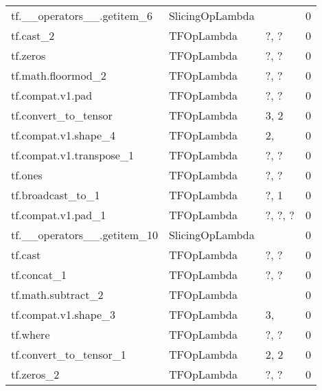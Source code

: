 \begin{longtable}{llll}
 tf.\_\_operators\_\_.getitem\_6 &    SlicingOpLambda &                                        &        0 \\
                  tf.cast\_2 &         TFOpLambda &                             ?, ? &        0 \\
                   tf.zeros &         TFOpLambda &                             ?, ? &        0 \\
         tf.math.floormod\_2 &         TFOpLambda &                             ?, ? &        0 \\
           tf.compat.v1.pad &         TFOpLambda &                             ?, ? &        0 \\
       tf.convert\_to\_tensor &         TFOpLambda &                                   3, 2 &        0 \\
       tf.compat.v1.shape\_4 &         TFOpLambda &                                     2, &        0 \\
   tf.compat.v1.transpose\_1 &         TFOpLambda &                             ?, ? &        0 \\
                    tf.ones &         TFOpLambda &                             ?, ? &        0 \\
          tf.broadcast\_to\_1 &         TFOpLambda &                                ?, 1 &        0 \\
         tf.compat.v1.pad\_1 &         TFOpLambda &                       ?, ?, ? &        0 \\
tf.\_\_operators\_\_.getitem\_10 &    SlicingOpLambda &                                        &        0 \\
                    tf.cast &         TFOpLambda &                             ?, ? &        0 \\
                tf.concat\_1 &         TFOpLambda &                             ?, ? &        0 \\
         tf.math.subtract\_2 &         TFOpLambda &                                        &        0 \\
       tf.compat.v1.shape\_3 &         TFOpLambda &                                     3, &        0 \\
                   tf.where &         TFOpLambda &                             ?, ? &        0 \\
     tf.convert\_to\_tensor\_1 &         TFOpLambda &                                   2, 2 &        0 \\
                 tf.zeros\_2 &         TFOpLambda &                             ?, ? &        0 \\

\end{longtable}
